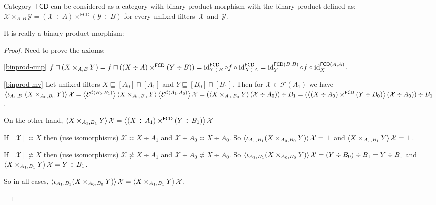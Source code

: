 \begin{defn}
Category~$\mathsf{FCD}$ can be considered as a category
with binary product morphism with the binary product
defined as:
$\mathcal{X}\times_{A,B}\mathcal{Y}=
(\mathcal{X}\div A)\times^{\mathsf{FCD}}(\mathcal{Y}\div B)$ for every unfixed filters~$\mathcal{X}$
and~$\mathcal{Y}$.
\end{defn}

It is really a binary product morphism:

\begin{proof}
Need to prove the axioms:

\begin{widedisorder}
\item[\ref{binprod-cmp}]
$f\sqcap(X\times_{A,B}Y)=
f\sqcap((X\div A)\times^{\mathsf{FCD}}(Y\div B))=
\operatorname{id}^{\mathsf{FCD}}_{Y\div B}\circ f\circ
\operatorname{id}^{\mathsf{FCD}}_{X\div A}=
\operatorname{id}^{\mathsf{FCD}(B,B)}_Y\circ f\circ\operatorname{id}^{\mathsf{FCD}(A,A)}_X$.

\item[\ref{binprod-mv}] Let unfixed filters
$X\sqsubseteq[A_0]\sqcap[A_1]$ and $Y\sqsubseteq[B_0]\sqcap[B_1]$.
Then for $\mathcal{X}\in\mathscr{F}(A_1)$ we have
$\left\langle \iota_{A_1,B_1}(X\times_{A_0,B_0}Y)\right\rangle\mathcal{X}=
\left\langle \mathcal{E}^{\mathcal{C}(B_0,B_1)}\right\rangle
\left\langle X\times_{A_0,B_0}Y\right\rangle
\left\langle \mathcal{E}^{\mathcal{C}(A_1,A_0)}\right\rangle\mathcal{X}=
(\left\langle X\times_{A_0,B_0}Y\right\rangle
(\mathcal{X}\div A_0))\div B_1=
(\left\langle (X\div A_0)\times^{\mathsf{FCD}}
(Y\div B_0)\right\rangle(\mathcal{X}\div A_0))\div B_1$.

On the other hand,
$\left\langle X\times_{A_1,B_1}Y\right\rangle\mathcal{X}=
\left\langle (X\div A_1)\times^{\mathsf{FCD}}
(Y\div B_1)\right\rangle\mathcal{X}$

If $[\mathcal{X}]\asymp X$ then (use isomorphisms)
$\mathcal{X}\asymp X\div A_1$ and
$\mathcal{X}\div A_0\asymp X\div A_0$. So
$\left\langle \iota_{A_1,B_1}(X\times_{A_0,B_0}Y)\right\rangle\mathcal{X}=
\bot$ and
$\left\langle X\times_{A_1,B_1}Y\right\rangle\mathcal{X}=\bot$.

If $[\mathcal{X}]\nasymp X$ then (use isomorphisms)
$\mathcal{X}\nasymp X\div A_1$ and
$\mathcal{X}\div A_0\nasymp X\div A_0$. So
$\left\langle \iota_{A_1,B_1}(X\times_{A_0,B_0}Y)\right\rangle\mathcal{X}=
(Y\div B_0)\div B_1=Y\div B_1$ and
$\left\langle X\times_{A_1,B_1}Y\right\rangle\mathcal{X}=Y\div B_1$.

So in all cases,
$\left\langle \iota_{A_1,B_1}(X\times_{A_0,B_0}Y)\right\rangle\mathcal{X}=
\left\langle X\times_{A_1,B_1}Y\right\rangle\mathcal{X}$.
\end{widedisorder}
\end{proof}

